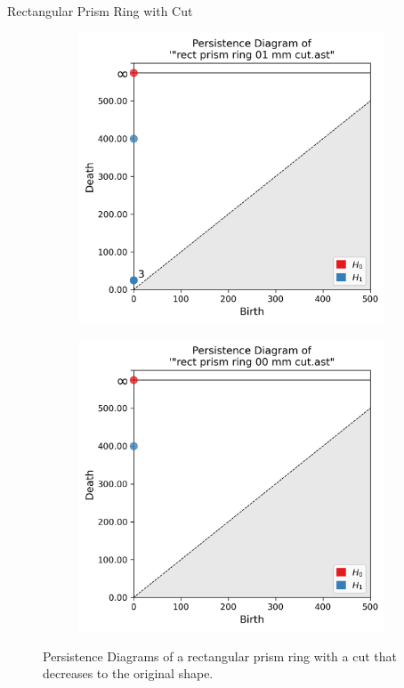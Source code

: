 \documentclass[xcolor=dvipsnames, aspectratio=169]{beamer}
\begin{document}
\begin{frame}{Rectangular Prism Ring with Cut}
\begin{figure}
\begin{subfigure}[b]{0.15\textwidth}
\end{subfigure}
\begin{subfigure}[b]{0.15\textwidth}
\includegraphics[width=\linewidth]{Final Run, (rect prism ring 01 mm cut) persdia.png}
\end{subfigure}
\begin{subfigure}[b]{0.15\textwidth}
\includegraphics[width=\linewidth]{Final Run, (rect prism ring 00 mm cut) persdia.png}
\end{subfigure}
\caption{Persistence Diagrams of a rectangular prism ring with a cut that decreases to the original shape.}
\label{fig:rect_prism_ring_persdia_table}
\end{figure}
\end{frame}
\end{document}
